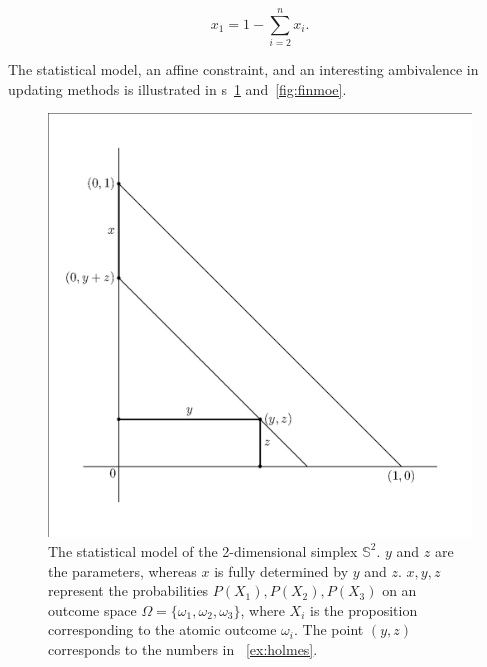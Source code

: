 \documentclass[phd,12pt,oneside]{ubcthesis}
\begin{document}
\begin{equation}
  \label{eq:poojaesu}
  x_{1}=1-\sum_{i=2}^{n}x_{i}.
\end{equation}

{\noindent}The statistical model, an affine constraint, and an
interesting ambivalence in updating methods is illustrated in
{\igure}s~\ref{fig:finmod} and~\ref{fig:finmoe}.

\begin{figure}[ht!]
    \begin{minipage}[h]{.7\linewidth}
      \includegraphics[width=\textwidth]{finmod.eps}
      \caption{\footnotesize The statistical model of the
        2-dimensional simplex $\mathbb{S}^{2}$. $y$ and $z$ are the
        parameters, whereas $x$ is fully determined by $y$ and $z$.
        $x,y,z$ represent the probabilities
        $P(X_{1}),P(X_{2}),P(X_{3})$ on an outcome space
        $\Omega=\{\omega_{1},\omega_{2},\omega_{3}\}$, where $X_{i}$
        is the proposition corresponding to the atomic outcome
        $\omega_{i}$. The point $(y,z)$ corresponds to the numbers in
        {\xample}~\ref{ex:holmes}.}
      \label{fig:finmod}
    \end{minipage}
\end{figure}
\end{document}
